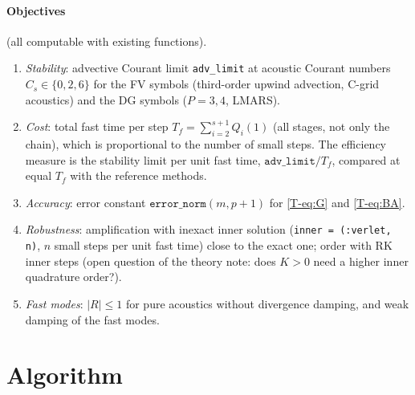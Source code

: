 \documentclass[11pt,a4paper]{article}
\begin{document}
\paragraph{Objectives} (all computable with existing functions).
\begin{enumerate}[label=O\arabic*]
\item \emph{Stability}: advective Courant limit \texttt{adv\_limit} at acoustic Courant numbers
  $C_s\in\{0,2,6\}$ for the FV symbols (third-order upwind advection, C-grid acoustics) and the DG symbols ($P=3,4$,
  LMARS).
\item \emph{Cost}: total fast time per step $T_f=\sum_{i=2}^{s+1}Q_i(1)$ (all stages, not only the chain), which is
  proportional to the number of small steps. The efficiency measure is the stability limit per unit fast time,
  $\texttt{adv\_limit}/T_f$, compared at equal $T_f$ with the reference methods.
\item \emph{Accuracy}: error constant $\texttt{error\_norm}(m,p+1)$ for \eqref{T-eq:G} and \eqref{T-eq:BA}.
\item \emph{Robustness}: amplification with inexact inner solution (\texttt{inner = (:verlet, n)}, $n$ small steps per unit
  fast time) close to the exact one; order with RK inner steps (open question of the theory note: does $K>0$ need a
  higher inner quadrature order?).
\item \emph{Fast modes}: $|R|\le1$ for pure acoustics without divergence damping, and weak damping of the fast modes.
\end{enumerate}

\section{Algorithm}
\end{document}

